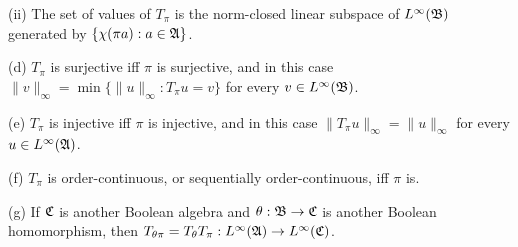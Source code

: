 \quad(ii) The set of values of $T_{\pi}$ is the norm-closed linear subspace
of $L^{\infty}(\frak B)$ generated by $\{\chi(\pi a):a\in\frak A\}$.

(d) $T_{\pi}$ is surjective iff $\pi$ is surjective, and in this case
$\|v\|_{\infty}=\min\{\|u\|_{\infty}:T_{\pi}u=v\}$ for every
$v\in L^{\infty}(\frak B)$.

(e) $T_{\pi}$ is injective iff $\pi$ is injective, and in this case
$\|T_{\pi}u\|_{\infty}=\|u\|_{\infty}$ for every
$u\in L^{\infty}(\frak A)$.

(f) $T_{\pi}$ is order-continuous, or sequentially order-continuous, iff
$\pi$ is.

(g) If $\frak C$ is another Boolean algebra and $\theta:\frak B\to\frak
C$ is another Boolean homomorphism, then $T_{\theta\pi}
=T_{\theta}T_{\pi}:L^{\infty}(\frak A)\to L^{\infty}(\frak C)$.

